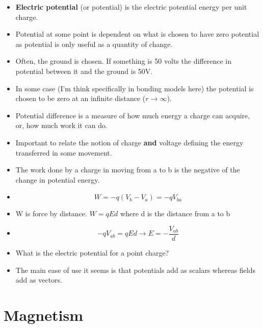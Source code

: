 \documentclass[11pt]{article}
\begin{document}
\begin{itemize}
\tightlist
\item
  \textbf{Electric potential} (or potential) is the electric potential
  energy per unit charge.
\item
  Potential at some point is dependent on what is chosen to have zero
  potential as potential is only useful as a quantity of change.
\item
  Often, the ground is chosen. If something is 50 volts the difference
  in potential between it and the ground is 50V.
\item
  In some case (I'm think specifically in bonding models here) the
  potential is chosen to be zero at an infinite distance
  (\(r \rightarrow \infty\)).
\item
  Potential difference is a measure of how much energy a charge can
  acquire, or, how much work it can do.
\item
  Important to relate the notion of charge \textbf{and} voltage defining
  the energy transferred in some movement.
\item
  The work done by a charge in moving from a to b is the negative of the
  change in potential energy.
\item
  \[W = -q(V_b - V_a) = -qV_{ba}\]
\item
  W is force by distance. \(W = qEd\) where d is the distance from a to
  b
\item
  \[-qV_{ab} = qEd \rightarrow E = -\frac{V_{ab}}{d}\]
\item
  What is the electric potential for a point charge?
\item
  The main ease of use it seems is that potentials add as scalars
  whereas fields add as vectors.
\end{itemize}

\hypertarget{magnetism}{%
\section{Magnetism}\label{magnetism}}
\end{document}
